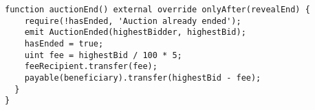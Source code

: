 \begin{lstlisting}[language=Solidity, firstnumber=9]
  function auctionEnd() external override onlyAfter(revealEnd) {
    require(!hasEnded, 'Auction already ended');
    emit AuctionEnded(highestBidder, highestBid);
    hasEnded = true;
    uint fee = highestBid / 100 * 5;
    feeRecipient.transfer(fee);
    payable(beneficiary).transfer(highestBid - fee);
  }
}
\end{lstlisting}